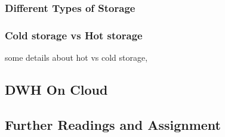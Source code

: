 \subsubsection{Different Types of Storage}
\begin{frame}

\frametitle{Cold storage vs Hot storage}

some details about hot vs cold storage,

\end{frame}

\subsection{DWH On Cloud}



\subsection{Further Readings and Assignment}


